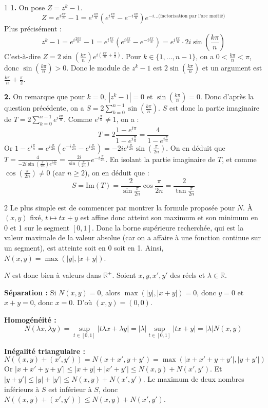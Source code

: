 \begin{correction}{1}
\textbf{1.} On pose $Z = z^k - 1$.
$$ Z = e^{i\frac{k\pi}{n}} - 1 = e^{i\frac{k\pi}{n}} \left( e^{i\frac{k\pi}{n}} - e^{-i\frac{k\pi}{n}} \right) e^{-i \dots \text{(factorisation par l'arc moitié)}} $$
Plus précisément :
$$ z^k - 1 = e^{i\frac{2k\pi}{n}} - 1 = e^{i\frac{k\pi}{n}} \left( e^{i\frac{k\pi}{n}} - e^{-i\frac{k\pi}{n}} \right) = e^{i\frac{k\pi}{n}} \cdot 2i \sin\left(\frac{k\pi}{n}\right) $$
C'est-à-dire $Z = 2 \sin\left(\frac{k\pi}{n}\right) e^{i\left(\frac{k\pi}{n} + \frac{\pi}{2}\right)}$.
Pour $k \in \{1, \dots, n-1\}$, on a $0 < \frac{k\pi}{n} < \pi$, donc $\sin\left(\frac{k\pi}{n}\right) > 0$.
Donc le module de $z^k-1$ est $2\sin\left(\frac{k\pi}{n}\right)$ et un argument est $\frac{k\pi}{n} + \frac{\pi}{2}$.

\textbf{2.} On remarque que pour $k=0$, $|z^k-1| = 0$ et $\sin\left(\frac{k\pi}{n}\right) = 0$.
Donc d'après la question précédente, on a $S = 2 \sum_{k=0}^{n-1} \sin\left(\frac{k\pi}{n}\right)$.
$S$ est donc la partie imaginaire de $T = 2 \sum_{k=0}^{n-1} e^{i\frac{k\pi}{n}}$.
Comme $e^{i\frac{\pi}{n}} \ne 1$, on a :
$$ T = 2 \frac{1 - e^{i\pi}}{1 - e^{i\frac{\pi}{n}}} = \frac{4}{1 - e^{i\frac{\pi}{n}}} $$
Or $1 - e^{i\frac{\pi}{n}} = e^{i\frac{\pi}{2n}} (e^{-i\frac{\pi}{2n}} - e^{i\frac{\pi}{2n}}) = -2i e^{i\frac{\pi}{2n}} \sin\left(\frac{\pi}{2n}\right)$.
On en déduit que $T = \frac{4}{-2i \sin\left(\frac{\pi}{2n}\right) e^{i\frac{\pi}{2n}}} = \frac{2i}{\sin\left(\frac{\pi}{2n}\right)} e^{-i\frac{\pi}{2n}}$.
En isolant la partie imaginaire de $T$, et comme $\cos\left(\frac{\pi}{2n}\right) \ne 0$ (car $n \ge 2$), on en déduit que :
$$ S = \text{Im}(T) = \frac{2}{\sin \frac{\pi}{2n}} \cos \frac{\pi}{2n} = \frac{2}{\tan \frac{\pi}{2n}} $$
\end{correction}

\begin{correction}{2}
Le plus simple est de commencer par montrer la formule proposée pour $N$.
À $(x,y)$ fixé, $t \mapsto tx+y$ est affine donc atteint son maximum et son minimum en 0 et 1 sur le segment $[0,1]$.
Donc la borne supérieure recherchée, qui est la valeur maximale de la valeur absolue (car on a affaire à une fonction continue sur un segment), est atteinte soit en 0 soit en 1.
Ainsi, $N(x,y) = \max(|y|, |x+y|)$.

$N$ est donc bien à valeurs dans $\mathbb{R}^+$.
Soient $x,y, x', y'$ des réels et $\lambda \in \mathbb{R}$.

\textbf{Séparation :} Si $N(x,y) = 0$, alors $\max(|y|, |x+y|) = 0$, donc $y = 0$ et $x+y = 0$, donc $x=0$. D'où $(x,y) = (0,0)$.

\textbf{Homogénéité :}
$$ N(\lambda x, \lambda y) = \sup_{t \in [0,1]} |t\lambda x + \lambda y| = |\lambda| \sup_{t \in [0,1]} |tx+y| = |\lambda| N(x,y) $$

\textbf{Inégalité triangulaire :}
$$ N((x,y) + (x',y')) = N(x+x', y+y') = \max(|x+x'+y+y'|, |y+y'|) $$
Or $|x+x'+y+y'| \le |x+y| + |x'+y'| \le N(x,y) + N(x',y')$.
Et $|y+y'| \le |y| + |y'| \le N(x,y) + N(x',y')$.
Le maximum de deux nombres inférieurs à $S$ est inférieur à $S$, donc $N((x,y)+(x',y')) \le N(x,y) + N(x',y')$.
\end{correction}

